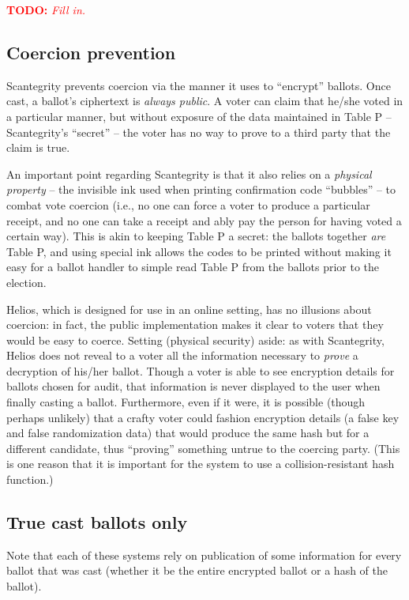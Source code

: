 \documentclass[10pt]{article}
\newcommand{\todo}[1]{\textcolor{red}{\textbf{TODO:} \emph{#1}}}
\begin{document}
\begin{multicols}{2}
\todo{Fill in.}

\subsection{Coercion prevention}

Scantegrity prevents coercion via the manner it uses to ``encrypt'' ballots. Once cast, a ballot's
ciphertext is \emph{always public}. A voter can claim that he/she voted in a particular manner, but
without exposure of the data maintained in Table P -- Scantegrity's ``secret'' -- the voter has no
way to prove to a third party that the claim is true.

An important point regarding Scantegrity is that it also relies on a \emph{physical property} -- the
invisible ink used when printing confirmation code ``bubbles'' -- to combat vote coercion (i.e., no
one can force a voter to produce a particular receipt, and no one can take a receipt and ably pay
the person for having voted a certain way). This is akin to keeping Table P a secret: the ballots
together \emph{are} Table P, and using special ink allows the codes to be printed without making it
easy for a ballot handler to simple read Table P from the ballots prior to the election.

Helios, which is designed for use in an online setting, has no illusions about coercion: in fact,
the public implementation makes it clear to voters that they would be easy to coerce. Setting
(physical security) aside: as with Scantegrity, Helios does not reveal to a voter all the
information necessary to \emph{prove} a decryption of his/her ballot. Though a voter is able to see
encryption details for ballots chosen for audit, that information is never displayed to the user
when finally casting a ballot. Furthermore, even if it were, it is possible (though perhaps
unlikely) that a crafty voter could fashion encryption details (a false key and false randomization
data) that would produce the same hash but for a different candidate, thus ``proving'' something
untrue to the coercing party. (This is one reason that it is important for the system to use a
collision-resistant hash function.)

\subsection{True cast ballots only}

Note that each of these systems rely on publication of some information for every ballot that was
cast (whether it be the entire encrypted ballot or a hash of the ballot).


\end{multicols}
\end{document}
